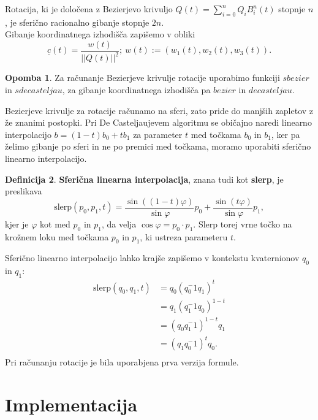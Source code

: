 \documentclass[12pt,a4paper,twoside]{article}
\theoremstyle{definition} %
\newtheorem{definicija}{Definicija}[section]
\newtheorem{opomba}[definicija]{Opomba}
\theoremstyle{plain} %
\numberwithin{equation}{section}  %
\begin{document}
\noindent Rotacija, ki je določena z Bezierjevo krivuljo $Q(t) = \sum\limits_{i=0}^{n} Q_i B_i^n(t)$ stopnje $n$, je sferično racionalno gibanje stopnje $2n$. \\

\noindent Gibanje koordinatnega izhodišča zapišemo v obliki
$$\underline{c}(t) = \frac{w(t)}{||Q(t)||^2};~ w(t) := (w_1(t), w_2(t),w_3(t)).$$

\begin{opomba}
Za računanje Bezierjeve krivulje rotacije uporabimo funkciji $sbezier$ in $sdecasteljau$, za gibanje koordinatnega izhodišča pa $bezier$ in $decasteljau$.
\end{opomba}

\noindent Bezierjeve krivulje za rotacije računamo na sferi, zato pride do manjših zapletov z že znanimi postopki. 
Pri De Casteljaujevem algoritmu se običajno naredi linearno interpolacijo $b = (1 - t) b_0 + t b_1$ za parameter $t$ med točkama $b_0$ in $b_1$,
ker pa želimo gibanje po sferi in ne po premici med točkama, moramo uporabiti sferično linearno interpolacijo.

\begin{definicija} {\bf Sferična linearna interpolacija}, znana tudi kot {\bf slerp}, je preslikava
    $$
        \text{slerp}(p_0, p_1, t) = \frac{\sin((1-t)\varphi)}{\sin \varphi} p_0 + \frac{\sin(t \varphi)}{\sin \varphi} p_1,
    $$
    kjer je $\varphi$ kot med $p_0$ in $p_1$, da velja $\cos \varphi = p_0 \cdot p_1$.
    Slerp torej vrne točko na krožnem loku med točkama $p_0$ in $p_1$, ki ustreza parameteru $t$.
\end{definicija}

\noindent Sferično linearno interpolacijo lahko krajše zapišemo v kontekstu kvaternionov $q_0$ in $q_1$:
\begin{align*}
    \text{slerp}(q_0, q_1, t) &= q_0 (q_0^-1 q_1)^t \\
    & = q_1 (q_1^-1 q_0)^{1-t}\\
    & = (q_0 q_1^-1)^{1-t}q_1 \\
    & = (q_1 q_0^-1)^t q_0. \\
\end{align*}
Pri računanju rotacije je bila uporabjena prva verzija formule.

\newpage

\section{Implementacija}
\end{document}
